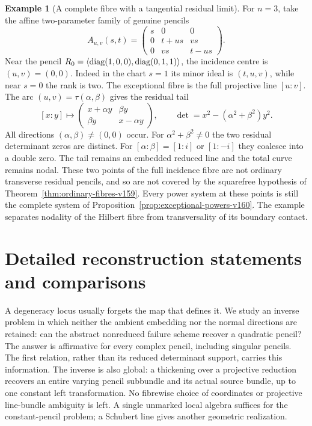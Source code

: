 \documentclass[11pt,reqno]{amsart}
\numberwithin{equation}{section}
\theoremstyle{definition}\newtheorem{definition}[theorem]{Definition}
\newtheorem{example}[theorem]{Example}
\theoremstyle{remark}\newtheorem{remark}[theorem]{Remark}
\begin{document}
\begin{example}[A complete fibre with a tangential residual limit]
\label{ex:tangent-limit-v160}
For $n=3$, take the affine two-parameter family of genuine pencils
\[
 A_{u,v}(s,t)=
 \begin{pmatrix}s&0&0\\0&t+us&vs\\0&vs&t-us\end{pmatrix}.
\]
Near the pencil $R_0=\langle\operatorname{diag}(1,0,0),\operatorname{diag}(0,1,1)\rangle$,
the incidence centre is $(u,v)=(0,0)$. Indeed in the chart $s=1$
its minor ideal is $(t,u,v)$, while near $s=0$ the rank is two.
The exceptional fibre is the full projective line $[u:v]$.
The arc $(u,v)=\tau(\alpha,\beta)$ gives the residual tail
\[
 [x:y]\longmapsto
 \begin{pmatrix}x+\alpha y&\beta y\\
                 \beta y&x-\alpha y\end{pmatrix},
 \qquad \det=x^2-(\alpha^2+\beta^2)y^2.
\]
All directions $(\alpha,\beta)\ne(0,0)$ occur. For
$\alpha^2+\beta^2\ne0$ the two residual determinant zeros are distinct.
For $[\alpha:\beta]=[1:i]$ or $[1:-i]$ they coalesce into a double
zero. The tail remains an embedded reduced line and the total curve
remains nodal. These two points of the full incidence fibre are not
ordinary transverse residual pencils, and so are not covered by the
squarefree hypothesis of Theorem~\ref{thm:ordinary-fibres-v159}.
Every power system at these points is still the complete system of
Proposition~\ref{prop:exceptional-powers-v160}. The example separates
nodality of the Hilbert fibre from transversality of its boundary
contact.
\end{example}


\appendix

\section{Detailed reconstruction statements and comparisons}
\label{sec:introduction-v132}

A degeneracy locus usually forgets the map that defines it.  We study
an inverse problem in which neither the ambient embedding nor the
normal directions are retained: can the abstract nonreduced failure
scheme recover a quadratic pencil?  The answer is affirmative for
every complex pencil, including singular pencils.  The first relation, rather than its reduced determinant support,
carries this information.  The inverse is also global: a thickening over a projective reduction
recovers an entire varying pencil subbundle and its actual source
bundle, up to one constant left transformation.  No fibrewise choice
of coordinates or projective line-bundle ambiguity is left.  A
single unmarked local algebra suffices for the constant-pencil
problem; a Schubert line gives another geometric realization.
\end{document}
